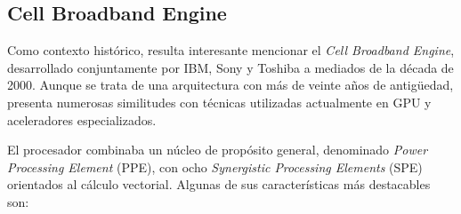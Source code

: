 \subsection{Cell Broadband Engine}

Como contexto histórico, resulta interesante mencionar el \textit{Cell Broadband Engine}, desarrollado conjuntamente por IBM, Sony y Toshiba a mediados de la década de 2000. Aunque se trata de una arquitectura con más de veinte años de antigüedad, presenta numerosas similitudes con técnicas utilizadas actualmente en GPU y aceleradores especializados. \cite{cellBE}

El procesador combinaba un núcleo de propósito general, denominado \textit{Power Processing Element} (PPE), con ocho \textit{Synergistic Processing Elements} (SPE) orientados al cálculo vectorial. Algunas de sus características más destacables son:

